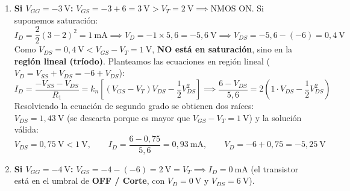 \begin{ejercicio}
\begin{enumerate}[label=\alph*)]
    \item \textbf{Si $V_{GG} = -3\ \si{\volt}$:} $V_{GS} = -3 + 6 = 3\ \si{\volt} > V_T = 2\ \si{\volt} \implies \text{NMOS ON}$.
    Si suponemos saturación:
    \begin{equation}
        I_D = \frac{2}{2}(3 - 2)^2 = 1\ \si{\milli\ampere} \implies V_D = -1 \times 5{,}6 = -5{,}6\ \si{\volt} \implies V_{DS} = -5{,}6 - (-6) = 0{,}4\ \si{\volt}
    \end{equation}
    Como $V_{DS} = 0{,}4\ \si{\volt} < V_{GS} - V_T = 1\ \si{\volt}$, \textbf{NO está en saturación}, sino en la \textbf{región lineal (tríodo)}.
    Planteamos las ecuaciones en región lineal ($V_D = V_{SS} + V_{DS} = -6 + V_{DS}$):
    \begin{equation}
        I_D = \frac{-V_{SS} - V_{DS}}{R_1} = k_n \left[ (V_{GS} - V_T) V_{DS} - \frac{1}{2} V_{DS}^2 \right] \implies \frac{6 - V_{DS}}{5{,}6} = 2 \left( 1 \cdot V_{DS} - \frac{1}{2} V_{DS}^2 \right)
    \end{equation}
    Resolviendo la ecuación de segundo grado se obtienen dos raíces: $V_{DS} = 1{,}43\ \si{\volt}$ (se descarta porque es mayor que $V_{GS}-V_T = 1\ \si{\volt}$) y la solución válida:
    \begin{equation}
        V_{DS} = 0{,}75\ \si{\volt} < 1\ \si{\volt}, \qquad I_D = \frac{6 - 0{,}75}{5{,}6} = 0{,}93\ \si{\milli\ampere}, \qquad V_D = -6 + 0{,}75 = -5{,}25\ \si{\volt}
    \end{equation}

    \item \textbf{Si $V_{GG} = -4\ \si{\volt}$:} $V_{GS} = -4 - (-6) = 2\ \si{\volt} = V_T \implies I_D = 0\ \si{\milli\ampere}$ (el transistor está en el umbral de \textbf{OFF / Corte}, con $V_D = 0\ \si{\volt}$ y $V_{DS} = 6\ \si{\volt}$).
\end{enumerate}
\end{ejercicio}

